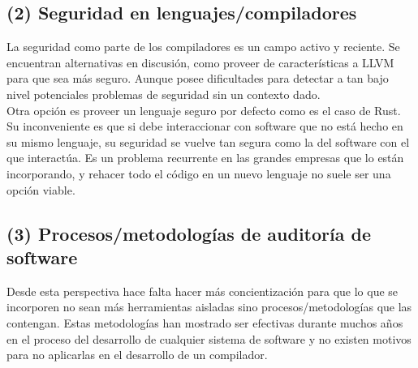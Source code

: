 \subsection{(2) Seguridad en lenguajes/compiladores}
La seguridad como parte de los compiladores es un campo activo y reciente. Se encuentran alternativas en discusión, como proveer de características a LLVM\cite{EbecosmCompilation}\cite{EbecosmSecurityCompilers} para que sea más seguro. Aunque posee dificultades para detectar a tan bajo nivel potenciales problemas de seguridad sin un contexto dado.\\

Otra opción es proveer un lenguaje seguro por defecto como es el caso de Rust. Su inconveniente es que si debe interaccionar con software que no está hecho en su mismo lenguaje, su seguridad se vuelve tan segura como la del software con el que interactúa. Es un problema recurrente en las grandes empresas que lo están incorporando, y rehacer todo el código en un nuevo lenguaje no suele ser una opción viable.\\

\subsection{(3) Procesos/metodologías de auditoría de software}
Desde esta perspectiva hace falta hacer más concientización para que lo que se incorporen no sean más herramientas aisladas sino procesos/metodologías que las contengan. Estas metodologías han mostrado ser efectivas durante muchos años en el proceso del desarrollo de cualquier sistema de software y no existen motivos para no aplicarlas en el desarrollo de un compilador. 
